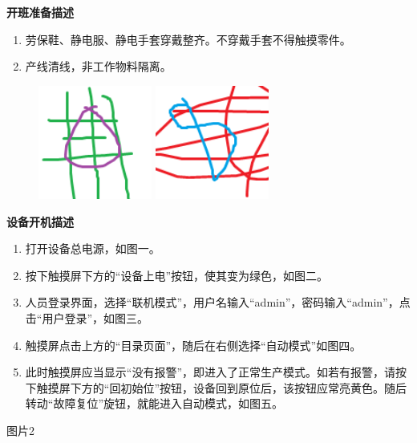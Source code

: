 \documentclass[UTF8]{ctexart}
\newcommand{\smalltitle}[1]{{\zihao{4}\bfseries{#1}}\\}
\begin{document}
\centering
\begin{boxedminipage}{184.6mm}
\centering
\smalltitle{开班准备描述}
\begin{boxedminipage}[t]{101.84mm}
\begin{enumerate}
\item 劳保鞋、静电服、静电手套穿戴整齐。不穿戴手套不得触摸零件。
\item 产线清线，非工作物料隔离。
\end{enumerate}
\end{boxedminipage}
\hfill
\begin{boxedminipage}[t]{78.76mm}
\begin{figure}[H]
\parbox[t]{37.38mm}{
\includegraphics[width=37.38mm]{pic01}
\caption{}}
\hfill
\parbox[t]{37.38mm}{
\includegraphics[width=37.38mm]{pic02}
\caption{}}
\end{figure}
\end{boxedminipage}
\end{boxedminipage}
\begin{boxedminipage}{184.6mm}
\centering
\smalltitle{设备开机描述}
\begin{boxedminipage}[t]{101.84mm}
\begin{enumerate}
\item 打开设备总电源，如图一。
\item 按下触摸屏下方的“设备上电”按钮，使其变为绿色，如图二。
\item 人员登录界面，选择“联机模式”，用户名输入“admin”，密码输入“admin”，点击“用户登录”，如图三。
\item 触摸屏点击上方的“目录页面”，随后在右侧选择“自动模式”如图四。
\item 此时触摸屏应当显示“没有报警”，即进入了正常生产模式。如若有报警，请按下触摸屏下方的“回初始位”按钮，设备回到原位后，该按钮应常亮黄色。随后转动“故障复位”旋钮，就能进入自动模式，如图五。
\end{enumerate}
\end{boxedminipage}
\hfill
\begin{boxedminipage}[t]{78.76mm}
图片2
\end{boxedminipage}
\end{boxedminipage}
\end{document}
